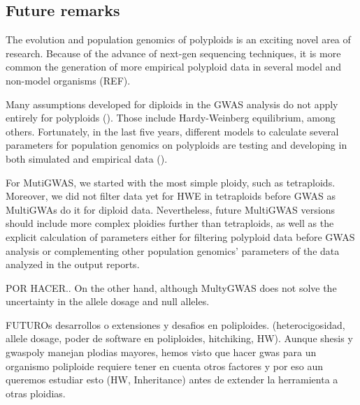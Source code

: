 \documentclass{article}
\begin{document}
\subsection{Future remarks}

The evolution and population genomics of polyploids is an exciting novel area of research. Because of the advance of next-gen sequencing techniques, it is more common the generation of more empirical polyploid data in several model and non-model organisms (REF). 

Many assumptions developed for diploids in the GWAS analysis do not apply entirely for polyploids (\cite{dufresne2014}). Those include Hardy-Weinberg equilibrium, among others. Fortunately, in the last five years, different models to calculate several parameters for population genomics on polyploids are testing and developing in both simulated and empirical data (\cite{meirmans2018,hardy2016population,blischak2016accounting}). 

For MutiGWAS, we started with the most simple ploidy, such as tetraploids. Moreover, we did not filter data yet for HWE in tetraploids before GWAS as MultiGWAs do it for diploid data. Nevertheless, future MultiGWAS versions should include more complex ploidies further than tetraploids, as well as the explicit calculation of parameters either for filtering polyploid data before GWAS analysis or complementing other population genomics' parameters of the data analyzed in the output reports.


POR HACER..
On the other hand, although MultyGWAS does not solve the uncertainty in the allele dosage and null alleles.

FUTUROs desarrollos o extensiones y desafios en poliploides.  (heterocigosidad, allele dosage, poder de software en poliploides, hitchiking, HW). Aunque shesis y gwaspoly manejan plodias mayores, hemos visto que hacer gwas para un organismo poliploide requiere tener en cuenta otros factores y por eso aun queremos estudiar esto (HW, Inheritance) antes de extender la herramienta a otras ploidias.
\end{document}
